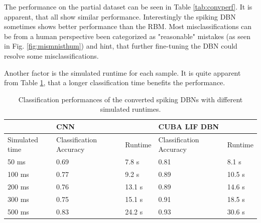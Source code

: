 
The performance on the partial dataset can be seen in Table \ref{tab:convperf}.
It is apparent, that all show similar performance. Interestingly the spiking DBN sometimes shows better performance than the RBM.
Most misclassifications can be from a human perspective been categorized as "reasonable" mistakes (as seen in Fig. \ref{fig:mismnisthum}) and hint, that further fine-tuning the DBN could resolve some misclassifications.

Another factor is the simulated runtime for each sample. It is quite apparent from Table \ref{tab:pervovert}, that a longer classification time benefits the performance.


\begin{table}[]
\centering
\caption{Classification performances of the converted spiking DBNs with different simulated runtimes.}
\label{tab:pervovert}
\begin{tabularx}{\textwidth}{l|ll|ll}
\hline
	 				& \multicolumn{2}{l}{CNN}   & \multicolumn{2}{|l}{CUBA LIF DBN} \\ \hline
Simulated time		 				& Classification Accuracy    & Runtime & Classification Accuracy    & Runtime \\ \hline
50 ms    	& 0.69 & 7.8 s 		& 0.81 & 8.1 s               \\
100 ms     	& 0.77 & 9.2 s  	& 0.89 & 10.5 s              \\
200 ms    	& 0.76 & 13.1 s   & 0.89 & 14.6 s             \\
300 ms    	& 0.75 & 15.1 s   & 0.91 & 18.5 s             \\
500 ms     	& 0.83 & 24.2 s    & 0.93 & 30.6 s             \\\hline
\end{tabularx}
\end{table}

